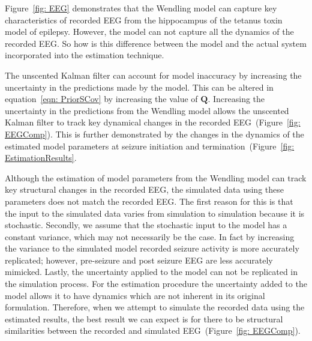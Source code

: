 Figure~\ref{fig: EEG} demonstrates that the Wendling model can capture key characteristics of recorded EEG from the hippocampus of the tetanus toxin model of epilepsy. However, the model can not capture all the dynamics of the recorded EEG. So how is this difference between the model and the actual system incorporated into the estimation technique.


The unscented Kalman filter can account for model inaccuracy by increasing the uncertainty in the predictions made by the model. This can be altered in equation~\ref{eqn: PriorSCov} by increasing the value of $\mathbf{Q}$. Increasing the uncertainty in the predictions from the Wendling model allows the unscented Kalman filter to track key dynamical changes in the recorded EEG~(Figure~\ref{fig: EEGComp}). This is further demonstrated by the changes in the dynamics of the estimated model parameters at seizure initiation and termination~(Figure~\ref{fig: EstimationResults}. 


Although the estimation of model parameters from the Wendling model can track key structural changes in the recorded EEG, the simulated data using these parameters does not match the recorded EEG. The first reason for this is that the input to the simulated data varies from simulation to simulation because it is stochastic. Secondly, we assume that the stochastic input to the model has a constant variance, which may not necessarily be the case. In fact by increasing the variance to the simulated model recorded seizure activity is  more accurately replicated; however, pre-seizure and post seizure EEG are less accurately mimicked. Lastly, the uncertainty applied to the model can not be replicated in the simulation process. For the estimation procedure the uncertainty added to the model allows it to have dynamics which are not inherent in its original formulation. Therefore, when we attempt to simulate the recorded data using the estimated results, the best result we can expect is for there to be structural similarities between the recorded and simulated EEG~(Figure~\ref{fig: EEGComp}). 


